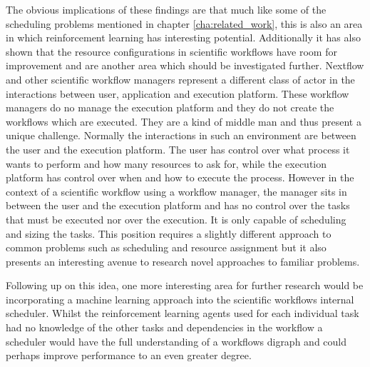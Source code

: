 The obvious implications of these findings are that much like some of the scheduling problems mentioned in chapter \ref{cha:related_work}, this is also an area in which reinforcement learning has interesting potential. Additionally it has also shown that the resource configurations in scientific workflows have room for improvement and are another area which should be investigated further. Nextflow and other scientific workflow managers represent a different class of actor in the interactions between user, application and execution platform. These workflow managers do no manage the execution platform and they do not create the workflows which are executed. They are a kind of middle man and thus present a unique challenge. Normally the interactions in such an environment are between the user and the execution platform. The user has control over what process it wants to perform and how many resources to ask for, while the execution platform has control over when and how to execute the process. However in the context of a scientific workflow using a workflow manager, the manager sits in between the user and the execution platform and has no control over the tasks that must be executed nor over the execution. It is only capable of scheduling and sizing the tasks. This position requires a slightly different approach to common problems such as scheduling and resource assignment but it also presents an interesting avenue to research novel approaches to familiar problems.

Following up on this idea, one more interesting area for further research would be incorporating a machine learning approach into the scientific workflows internal scheduler. Whilst the reinforcement learning agents used for each individual task had no knowledge of the other tasks and dependencies in the workflow a scheduler would have the full understanding of a workflows digraph and could perhaps improve performance to an even greater degree. 

